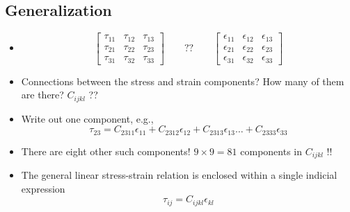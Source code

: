 \documentclass[11pt]{article}
\begin{document}
\subsection*{Generalization}
\label{sec:org8b67cc2}
\begin{itemize}
\item $$ \begin{bmatrix} \tau_{11} & \tau_{12} & \tau_{13} \\ \tau_{21} & \tau_{22} & \tau_{23} \\ \tau_{31} & \tau_{32} & \tau_{33} \end{bmatrix} \hspace{2em} ?? \hspace{2em} \begin{bmatrix} \epsilon_{11} & \epsilon_{12} & \epsilon_{13} \\ \epsilon_{21} & \epsilon_{22} & \epsilon_{23} \\ \epsilon_{31} & \epsilon_{32} & \epsilon_{33} \end{bmatrix} $$
\end{itemize}
\begin{itemize}
\item Connections between the stress and strain components? How many of them are there? \(C_{ijkl}\) ??
\item Write out one component, e.g.,
$$ \tau_{23} = C_{2311} \epsilon_{11} + C_{2312} \epsilon_{12} + C_{2313} \epsilon_{13} \ldots + C_{2333} \epsilon_{33} $$
\item There are eight other such components! \(9\times 9 = 81\) components in \(C_{ijkl}\) !!
\item The general linear stress-strain relation is enclosed within a single indicial expression
$$ \tau_{ij} = C_{ijkl} \epsilon_{kl} $$
\end{itemize}
\end{document}
